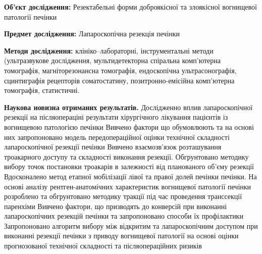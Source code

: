 \textbf{Об’єкт дослідження:} Резектабельні форми доброякісної та злоякісної вогнищевої патології печінки

\textbf{Предмет дослідження:} Лапароскопічна резекція печінки


\textbf{Методи дослідження:} клініко–лабораторні, інструментальні методи (ультразвукове дослідження, мультидетекторна спіральна комп’ютерна томографія, магніторезонансна томографія, ендоскопічна ультрасонографія, сцинтиграфія рецепторів соматостатину, позитронно-емісійна комп’ютерна томографія, статистичні.


\textbf{Наукова новизна отриманих результатів.} 
Дослідженно вплив лапароскопічної резекції на післяопераціні результати хірургічного лікування пацієнтів із вогнищевою патологією печінки
Вивчено фактори що обумовлюють та на основі них запропоновано модель передопераційної  оцінки технічної складності лапароскопічної резекції печінки
Вивчено взаємозв’язок розташування троакарного доступу та складності виконання резекції. Обгрунтовано методику вибору точок постановки троакарів в залежності від планованого об’єму резекції
Вдосконалено метод етапної мобілізації лівої та правої долей печінки печінки.
На основі аналізу рентген-анатомічних характеристик вогнищевої патології печінки розроблено та обгрунтовано методику тракції під час проведення транссекції паренхіми
Вивчено фактори, що призводять до конверсій при виконанні лапароскопічних резекцій печінки та запропоновано способи їх профілактики 
Запропоновано алгоритм вибору між відкритим та лапароскопічним доступом при виконанні резекції печінки з приводу вогнищевої патології на основі оцінки прогнозованої технічної складності та післяопераційних ризиків 

